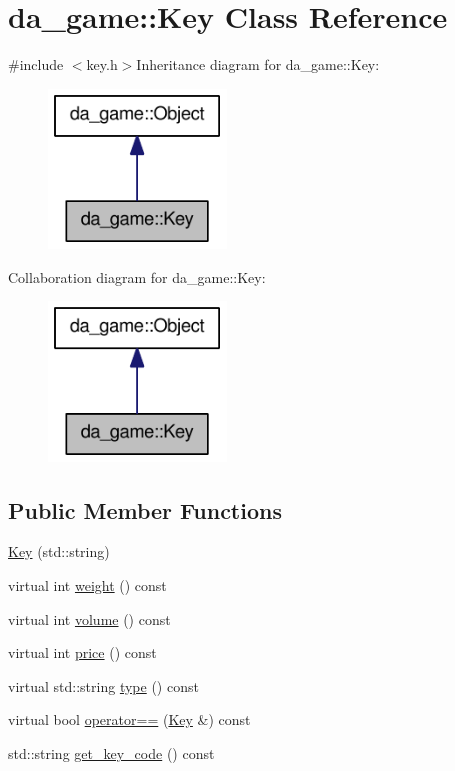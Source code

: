 \hypertarget{classda__game_1_1Key}{
\section{da\_\-game::Key Class Reference}
\label{classda__game_1_1Key}
}


{\ttfamily \#include $<$key.h$>$}Inheritance diagram for da\_\-game::Key:\nopagebreak
\begin{figure}[H]
\begin{center}
\leavevmode
\includegraphics[width=134pt]{classda__game_1_1Key__inherit__graph}
\end{center}
\end{figure}
Collaboration diagram for da\_\-game::Key:\nopagebreak
\begin{figure}[H]
\begin{center}
\leavevmode
\includegraphics[width=134pt]{classda__game_1_1Key__coll__graph}
\end{center}
\end{figure}
\subsection*{Public Member Functions}
\begin{DoxyCompactItemize}
\item 
\hyperlink{classda__game_1_1Key_a15fcc235eb6d5c76e574fd02ab9bad4b}{Key} (std::string)
\item 
virtual int \hyperlink{classda__game_1_1Key_a3a55f412166c6da8d3919978edb214e5}{weight} () const 
\item 
virtual int \hyperlink{classda__game_1_1Key_ac21b171678f19465b41796007896dc84}{volume} () const 
\item 
virtual int \hyperlink{classda__game_1_1Key_af9752b65636483258a50e7ae553d131a}{price} () const 
\item 
virtual std::string \hyperlink{classda__game_1_1Key_adaecf6030e14cd4da5142e8c760c5741}{type} () const 
\item 
virtual bool \hyperlink{classda__game_1_1Key_af3b5c0256dfcfc935e898d27dd47ffeb}{operator==} (\hyperlink{classda__game_1_1Key}{Key} \&) const 
\item 
std::string \hyperlink{classda__game_1_1Key_a1d96d265ce05db8566dfd62615de61c6}{get\_\-key\_\-code} () const 
\end{DoxyCompactItemize}



